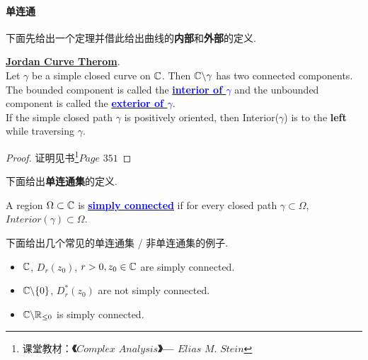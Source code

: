 \paragraph{单连通}
	下面先给出一个定理并借此给出曲线的\textbf{内部}和\textbf{外部}的定义.
	\begin{thm}\label{thm 4.3.1}
		\underline{\textbf{Jordan Curve Therom}}.\\
		Let $\gamma$ be a simple closed curve on $\mathbb{C}$. Then $\mathbb{C} \backslash \gamma$ has two connected components. The bounded component is called the \underline{\textcolor{blue}{\textbf{interior of $\gamma$}}} and the unbounded component is called the \underline{\textcolor{blue}{\textbf{exterior of $\gamma$}}}.\\
		
		If the simple closed path $\gamma$ is positively oriented, then Interior($\gamma$) is to the \textbf{left} while traversing $\gamma$.
		
		\vspace{2em}
		\begin{proof}
			证明见书\footnote{课堂教材：\textbf{《$Complex \,\, Analysis$》---  $Elias \,\, M. \,\, Stein$}}$Page \,\, 351$
		\end{proof}
	\end{thm}
	
	\vspace{2em}
	下面给出\textbf{单连通集}的定义.
	\begin{defn}\label{def 4.3.1}
		A region $\Omega \subset \mathbb{C}$ is \underline{\textcolor{blue}{\textbf{simply connected}}} if for every closed path $\gamma \subset \Omega$, $Interior(\gamma) \subset \Omega$.
	\end{defn}
	
	\vspace{2em}
	\begin{example}\label{ex 4.3.1}
		下面给出几个常见的单连通集 / 非单连通集的例子.
		\begin{itemize}
			\item $\mathbb{C}$, $D_{r}(z_0)$, $r > 0 , z_0 \in \mathbb{C}$ are simply connected.
			
			\item $\mathbb{C} \backslash \{ 0 \}$, $D_{r}^{*}(z_0)$ are not simply connected.
			
			\item $\mathbb{C} \backslash \mathbb{R}_{\leq 0}$ is simply connected.
		\end{itemize}
	\end{example}

\newpage

